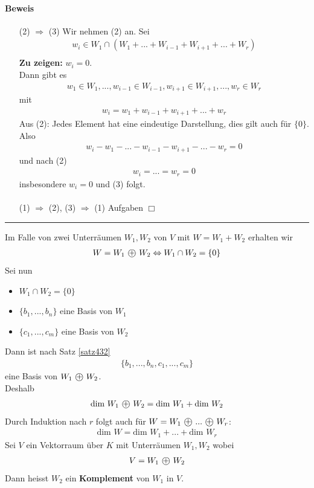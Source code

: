 \documentclass[11pt]{report}
\newcommand*\directsum{%
\text{ \textcircled{+} }
}
\newcommand*\f[1] {\textbf{#1}}
\begin{document}
\paragraph{Beweis}
\begin{itemize}
 \item[(2) $\Rightarrow$ (3)] Wir nehmen (2) an. Sei 
\begin{align}
w_i \in W_1 \cap (W_1 + ... + W_{i-1} + W_{i+1} + ... + W_r) \\
\end{align}
\f{Zu zeigen:} $w_i = 0$.\\
Dann gibt es
\begin{align}
 w_1 \in W_1, ..., w_{i-1} \in W_{i-1}, w_{i+1} \in W_{i+1}, ..., w_r \in W_r
\end{align}
mit 
\begin{align}
 w_i = w_1 + w_{i-1} + w_{i+1} + ... + w_r
\end{align}
Aus (2): Jedes Element hat eine eindeutige Darstellung, dies gilt auch für $\{0\}$.\\
Also
\begin{align}
 w_i - w_1 - ... - w_{i-1} - w_{i+1} - ... - w_r = 0
\end{align}
und nach (2)
\begin{align}
 w_i = ... = w_r = 0
\end{align}
insbesondere $w_i=0$ und (3) folgt. \\\\ (1) $\Rightarrow $ (2), (3) $\Rightarrow$ (1) Aufgaben \hfill $\Box$
\end{itemize}
\vspace*{0.2cm}\rule{\linewidth}{0.3mm}\vspace{0.2cm}
Im Falle von zwei Unterräumen $W_1, W_2$ von $V$ mit $W = W_1 + W_2$ erhalten wir
\begin{align}
 W = W_1 \directsum W_2 \Leftrightarrow W_1 \cap W_2 = \{0\}
\end{align} \newpage
\noindent Sei nun
\begin{itemize}
 \item $W_1 \cap W_2 = \{0\}$
 \item $\{b_1, ..., b_n\}$ eine Basis von $W_1$
 \item $\{c_1, ..., c_m\}$ eine Basis von $W_2$
\end{itemize}
Dann ist nach Satz \ref{satz432}
\begin{align}
 \{b_1, ..., b_n, c_1, ..., c_m\}
\end{align}
eine Basis von $W_1 \directsum W_2$.\\
Deshalb
\begin{align}
\text{dim } W_1 \directsum W_2 = \text{dim } W_1 + \text{dim } W_2
\end{align}
Durch Induktion nach $r$ folgt auch für $W=W_1 \directsum ...\directsum W_r$:
\begin{align}
 \text{dim } W = \text{dim } W_1 + ... + \text{dim } W_r
\end{align}
Sei $V$ ein Vektorraum über $K$ mit Unterräumen $W_1, W_2$ wobei
\begin{align}
 V = W_1 \directsum W_2
\end{align}
Dann heisst $W_2$ ein \f{Komplement} von $W_1$ in $V$.
\end{document}
